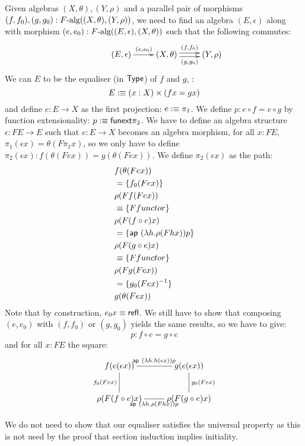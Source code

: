 \documentclass[a4paper,10pt]{article}
\begin{document}
Given algebras $(X,\theta), (Y,\rho)$ and a parallel pair of morphisms
$(f,f_0),(g,g_0) : F\mbox{-alg}((X,\theta),(Y,\rho))$, we need to find
an algebra $(E,\epsilon)$ along with morphism
$(e,e_0) : F\mbox{-alg}((E,\epsilon),(X,\theta))$ such that the
following commutes:
$$
\xymatrix{ &(E,\epsilon) \ar[r]^{(e,e_0)} &(X,\theta) \ar@<-.5ex>[r]_-{(g,g_0)}
  \ar@<.5ex>[r]^-{(f,f_0)} &(Y,\rho) }
$$
We can $E$ to be the equaliser (in $\mathsf{Type}$) of $f$ and $g$, \ie:
$$
E :\equiv (x : X) \times (f x = g x)
$$
and define $e : E \to X$ as the first projection: $e :\equiv \pi_1$.
We define $p : e \circ f = e \circ g$ by function extensionality:
$p :\equiv \mathsf{funext} \pi_2$. We have to define an algebra
structure $\epsilon : FE \to E$ such that $e : E \to X$ becomes an
algebra morphism, \ie for all $x : FE$,
$\pi_1 (\epsilon x) = \theta (F \pi_1 x)$, so we only have to define
$\pi_2 (\epsilon x) : f (\theta (F e x)) = g (\theta (F e x))$. We
define $\pi_2 (\epsilon x)$ as the path:
%
\begin{align*}
  &f (\theta (F e x)) \\
  &= \{ f_0 (F e x) \} \\
  &\rho (F f (F e x)) \\
  &\equiv \{ F functor \} \\
  &\rho (F (f \circ e) x) \\
  &= \{ \mathsf{ap}\ (\lambda h . \rho (F h x)) p \} \\
  &\rho (F (g \circ e) x) \\
  &\equiv \{ F functor \} \\
  &\rho (F g (F e x)) \\
  &= \{ g_0 (F e x) ^{-1} \} \\
  &g (\theta (F e x))
\end{align*}
%
Note that by construction, $e_0 x \equiv \operatorname{\mathsf{refl}}$. We still have to show
that composing $(e,e_0)$ with $(f,f_0)$ or $(g,g_0)$ yields the same
results, so we have to give:
$$
p : f \circ e = g \circ e
$$
and for all $x : FE$ the square:
$$
\xymatrix{
f (e (\epsilon x)) 
  \ar@{-}[r]^{\ap\ (\lambda h . h (\epsilon x)) p} 
  \ar@{-}[d]_{f_0 (F e x)}  
&g (e (\epsilon x)) 
  \ar@{-}[d]^{g_0 (F e x)}
\\
\rho (F (f \circ e) x)
  \ar@{-}[r]_{\ap\ (\lambda h . \rho (F h x)) p}
&\rho (F (g \circ e) x)}
$$


We do not need to show that our equaliser satisfies the universal
property as this is not used by the proof that section induction
implies initiality.
\end{document}
